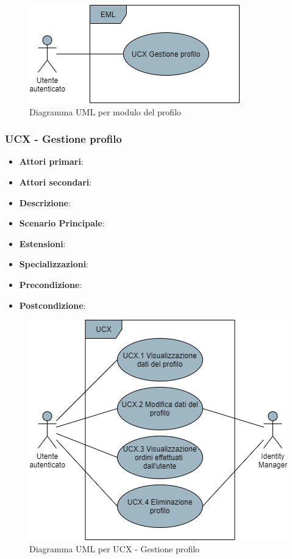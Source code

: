 \begin{figure}[H]
\centering
\includegraphics[scale=0.6]{res/UseCase/Immagini/ProfiloGenerale}
\caption{Diagramma UML per modulo del profilo}
\end{figure}

\subsubsection{UCX - Gestione profilo}
\begin{itemize}
\item \textbf{Attori primari}:
\item \textbf{Attori secondari}:
\item \textbf{Descrizione}:
\item \textbf{Scenario Principale}:
\item \textbf{Estensioni}:
\item \textbf{Specializzazioni}:
\item \textbf{Precondizione}:
\item \textbf{Postcondizione}:
\end{itemize}

\begin{figure}[H]
\centering
\includegraphics[scale=0.6]{res/UseCase/Immagini/GestioneProfilo}
\caption{Diagramma UML per UCX - Gestione profilo}
\end{figure}

